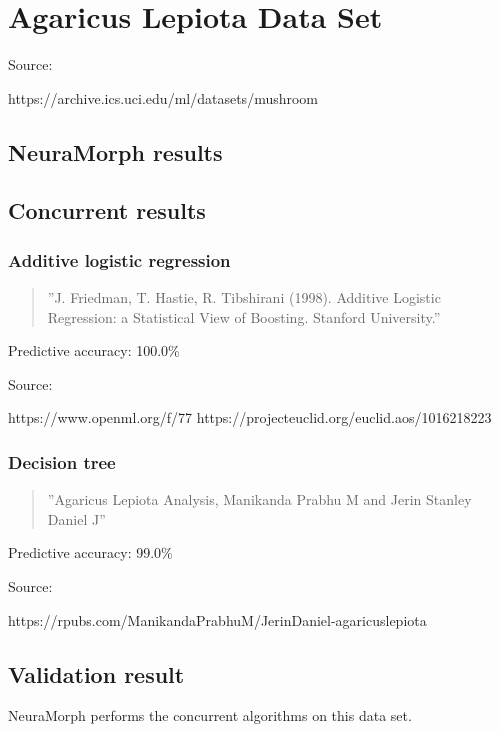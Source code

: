 \documentclass[8pt, a4paper]{article}
\begin{document}
\newpage
\section{Agaricus Lepiota Data Set}

Source: 

https://archive.ics.uci.edu/ml/datasets/mushroom

\subsection{NeuraMorph results}

%

\subsection{Concurrent results}

\subsubsection{Additive logistic regression}

\begin{quote}
''J. Friedman, T. Hastie, R. Tibshirani (1998). Additive Logistic Regression: a Statistical View of Boosting. Stanford University.''
\end{quote}

Predictive accuracy: 100.0\%

Source:

https://www.openml.org/f/77
https://projecteuclid.org/euclid.aos/1016218223

\subsubsection{Decision tree}

\begin{quote}
''Agaricus Lepiota Analysis, Manikanda Prabhu M and Jerin Stanley Daniel J''
\end{quote}

Predictive accuracy: 99.0\%

Source:

https://rpubs.com/ManikandaPrabhuM/JerinDaniel-agaricuslepiota

\subsection{Validation result}

NeuraMorph performs  the concurrent algorithms on this data set.
\end{document}
